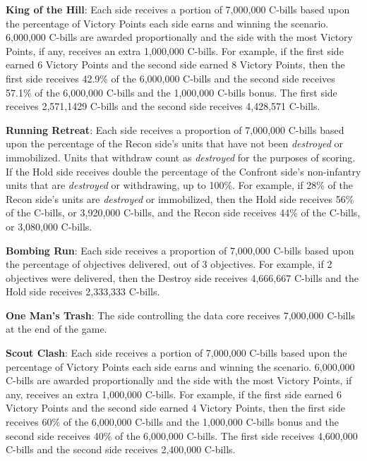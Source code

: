 \begin{description}
\item {\bfseries King of the Hill}: Each side receives a portion of 7,000,000 C-bills based upon the percentage of Victory Points each side earns and winning the scenario.
6,000,000 C-bills are awarded proportionally and the side with the most Victory Points, if any, receives an extra 1,000,000 C-bills.
For example, if the first side earned 6 Victory Points and the second side earned 8 Victory Points, then the first side receives 42.9\% of the 6,000,000 C-bills and the second side receives 57.1\% of the 6,000,000 C-bills and the 1,000,000 C-bills bonus.
The first side receives 2,571,1429 C-bills and the second side receives 4,428,571 C-bills.

\item {\bfseries Running Retreat}: Each side receives a proportion of 7,000,000 C-bills based upon the percentage of the Recon side's units that have not been \emph{destroyed} or immobilized.
Units that withdraw count as \emph{destroyed} for the purposes of scoring.
If the Hold side receives double the percentage of the Confront side's non-infantry units that are \emph{destroyed} or withdrawing, up to 100\%.
For example, if 28\% of the Recon side's units are \emph{destroyed} or immobilized, then the Hold side receives 56\% of the C-bills, or 3,920,000 C-bills, and the Recon side receives 44\% of the C-bills, or 3,080,000 C-bills.

\item {\bfseries Bombing Run}: Each side receives a proportion of 7,000,000 C-bills based upon the percentage of objectives delivered, out of 3 objectives.
For example, if 2 objectives were delivered, then the Destroy side receives 4,666,667 C-bills and the Hold side receives 2,333,333 C-bills.

\item {\bfseries One Man's Trash}: The side controlling the data core receives 7,000,000 C-bills at the end of the game.

\item {\bfseries Scout Clash}: Each side receives a portion of 7,000,000 C-bills based upon the percentage of Victory Points each side earns and winning the scenario.
6,000,000 C-bills are awarded proportionally and the side with the most Victory Points, if any, receives an extra 1,000,000 C-bills.
For example, if the first side earned 6 Victory Points and the second side earned 4 Victory Points, then the first side receives 60\% of the 6,000,000 C-bills and the 1,000,000 C-bills bonus and the second side receives 40\% of the 6,000,000 C-bills.
The first side receives 4,600,000 C-bills and the second side receives 2,400,000 C-bills.


\end{description}
